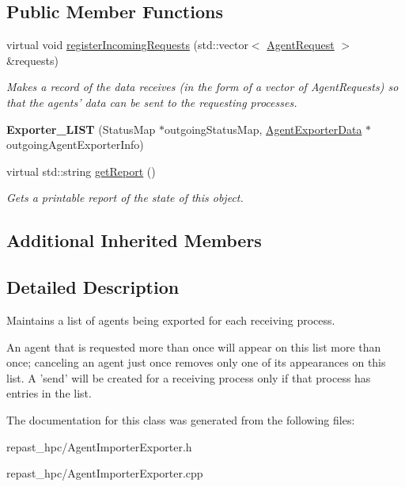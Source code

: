 \subsection*{Public Member Functions}
\begin{DoxyCompactItemize}
\item 
\hypertarget{classrepast_1_1_exporter___l_i_s_t_af3ef5c07f5a8d1eb38c5b97727f92c9e}{virtual void \hyperlink{classrepast_1_1_exporter___l_i_s_t_af3ef5c07f5a8d1eb38c5b97727f92c9e}{register\-Incoming\-Requests} (std\-::vector$<$ \hyperlink{classrepast_1_1_agent_request}{Agent\-Request} $>$ \&requests)}\label{classrepast_1_1_exporter___l_i_s_t_af3ef5c07f5a8d1eb38c5b97727f92c9e}

\begin{DoxyCompactList}\small\item\em Makes a record of the data receives (in the form of a vector of Agent\-Requests) so that the agents' data can be sent to the requesting processes. \end{DoxyCompactList}\item 
\hypertarget{classrepast_1_1_exporter___l_i_s_t_a2df4abe8a73a23ec17bd02ec05833ec4}{{\bfseries Exporter\-\_\-\-L\-I\-S\-T} (Status\-Map $\ast$outgoing\-Status\-Map, \hyperlink{classrepast_1_1_agent_exporter_data}{Agent\-Exporter\-Data} $\ast$outgoing\-Agent\-Exporter\-Info)}\label{classrepast_1_1_exporter___l_i_s_t_a2df4abe8a73a23ec17bd02ec05833ec4}

\item 
\hypertarget{classrepast_1_1_exporter___l_i_s_t_a6b868c012bd5547d510f862c8bce620d}{virtual std\-::string \hyperlink{classrepast_1_1_exporter___l_i_s_t_a6b868c012bd5547d510f862c8bce620d}{get\-Report} ()}\label{classrepast_1_1_exporter___l_i_s_t_a6b868c012bd5547d510f862c8bce620d}

\begin{DoxyCompactList}\small\item\em Gets a printable report of the state of this object. \end{DoxyCompactList}\end{DoxyCompactItemize}
\subsection*{Additional Inherited Members}


\subsection{Detailed Description}
Maintains a list of agents being exported for each receiving process. 

An agent that is requested more than once will appear on this list more than once; canceling an agent just once removes only one of its appearances on this list. A 'send' will be created for a receiving process only if that process has entries in the list. 

The documentation for this class was generated from the following files\-:\begin{DoxyCompactItemize}
\item 
repast\-\_\-hpc/Agent\-Importer\-Exporter.\-h\item 
repast\-\_\-hpc/Agent\-Importer\-Exporter.\-cpp\end{DoxyCompactItemize}
